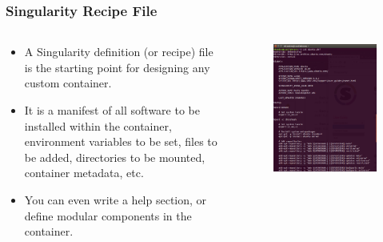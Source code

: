 \documentclass{beamer}
\begin{document}
\begin{frame}
   \frametitle{Singularity Recipe File}
   \begin{columns}
      \begin{column}{0.6\textwidth}
         \begin{itemize}
            \setlength\itemsep{1.0em}
            \item A Singularity definition (or recipe) file is the starting
               point for designing any custom container.
            \item It is a manifest of all software to be installed
               within the container, environment variables to be set,
               files to be added, directories to be mounted,
               container metadata, etc.
            \item You can even write a help section, or define modular
               components in the container.
         \end{itemize}
      \end{column}
      \hfill
      \begin{column}{0.5\textwidth}
         \begin{figure}[htbp]
            \includegraphics[width=1.0\textwidth]{images/singularity-definition-file.png}
         \end{figure}
      \end{column}
   \end{columns}
\end{frame}
\end{document}
